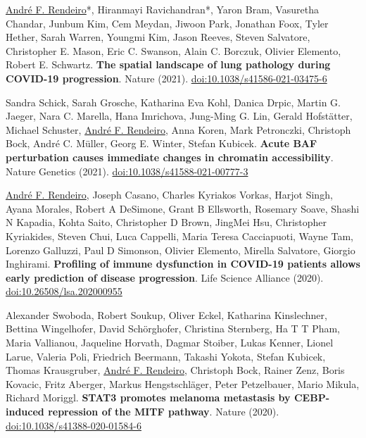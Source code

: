 \documentclass[11pt,a4paper,roman]{moderncv} %
\begin{document}
\begin{etaremune}[leftmargin=1.0cm, itemindent=0pt, topsep=10pt, itemsep=2pt, partopsep=0pt, parsep=0pt]
        \item \underline{André F. Rendeiro}*, Hiranmayi Ravichandran*, Yaron Bram, Vasuretha Chandar, Junbum Kim, Cem Meydan, Jiwoon Park, Jonathan Foox, Tyler Hether, Sarah Warren, Youngmi Kim, Jason Reeves, Steven Salvatore, Christopher E. Mason, Eric C. Swanson, Alain C. Borczuk, Olivier Elemento, Robert E. Schwartz. \textbf{The spatial landscape of lung pathology during COVID-19 progression}. Nature (2021). \href{https://dx.doi.org/10.1038/s41586-021-03475-6}{doi:10.1038/s41586-021-03475-6}

        \item Sandra Schick, Sarah Grosche, Katharina Eva Kohl, Danica Drpic, Martin G. Jaeger, Nara C. Marella, Hana Imrichova, Jung-Ming G. Lin, Gerald Hofstätter, Michael Schuster, \underline{André F. Rendeiro}, Anna Koren, Mark Petronczki, Christoph Bock, André C. Müller, Georg E. Winter, Stefan Kubicek. \textbf{Acute BAF perturbation causes immediate changes in chromatin accessibility}. Nature Genetics (2021). \href{https://dx.doi.org/10.1038/s41588-021-00777-3}{doi:10.1038/s41588-021-00777-3}
    
        \item \underline{André F. Rendeiro}, Joseph Casano, Charles Kyriakos Vorkas, Harjot Singh, Ayana Morales, Robert A DeSimone, Grant B Ellsworth, Rosemary Soave, Shashi N Kapadia, Kohta Saito, Christopher D Brown, JingMei Hsu, Christopher Kyriakides, Steven Chui, Luca Cappelli, Maria Teresa Cacciapuoti, Wayne Tam, Lorenzo Galluzzi, Paul D Simonson, Olivier Elemento, Mirella Salvatore, Giorgio Inghirami. \textbf{Profiling of immune dysfunction in COVID-19 patients allows early prediction of disease progression}. Life Science Alliance (2020). \href{https://dx.doi.org/10.26508/lsa.202000955}{doi:10.26508/lsa.202000955}

        \item Alexander Swoboda, Robert Soukup, Oliver Eckel, Katharina Kinslechner, Bettina Wingelhofer, David Schörghofer, Christina Sternberg, Ha T T Pham, Maria Vallianou, Jaqueline Horvath, Dagmar Stoiber, Lukas Kenner, Lionel Larue, Valeria Poli, Friedrich Beermann, Takashi Yokota, Stefan Kubicek, Thomas Krausgruber, \underline{André F. Rendeiro}, Christoph Bock, Rainer Zenz, Boris Kovacic, Fritz Aberger, Markus Hengstschläger, Peter Petzelbauer, Mario Mikula, Richard Moriggl. \textbf{STAT3 promotes melanoma metastasis by CEBP-induced repression of the MITF pathway}. Nature (2020).
        \href{https://dx.doi.org/10.1038/s41388-020-01584-6}{doi:10.1038/s41388-020-01584-6}


\end{etaremune}
\end{document}
